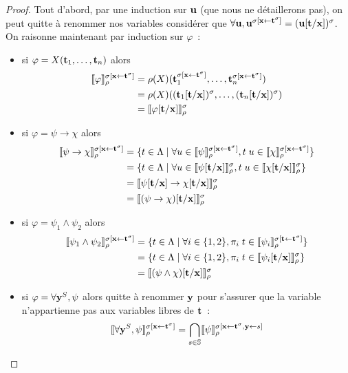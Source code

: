 \documentclass{article}
\begin{document}
\begin{proof}
  Tout d'abord, par une induction sur $\mathbf{u}$ (que nous ne détaillerons pas), on peut quitte à renommer nos variables considérer que $\forall \mathbf{u}, \mathbf{u}^{\sigma[\mathbf{x}\leftarrow \mathbf{t}^\sigma]} = (\mathbf{u}[\mathbf{t}/\mathbf{x}])^\sigma$. On raisonne maintenant par induction sur $\varphi$~:
  \begin{itemize}
  \item si $\varphi = X(\mathbf{t}_1,\ldots,\mathbf{t}_n)$ alors
    \begin{align*}
      \llbracket \varphi \rrbracket_\rho^{\sigma[\mathbf{x}\leftarrow \mathbf{t}^\sigma]} &= \rho(X)(\mathbf{t}_1^{\sigma[\mathbf{x}\leftarrow \mathbf{t}^\sigma]},\ldots,\mathbf{t}_n^{\sigma[\mathbf{x}\leftarrow \mathbf{t}^\sigma]})\\
      &= \rho(X)((\mathbf{t}_1[\mathbf{t}/\mathbf{x}])^\sigma,\ldots,(\mathbf{t}_n[\mathbf{t}/\mathbf{x}])^\sigma)\\
      &= \llbracket \varphi[\mathbf{t}/\mathbf{x}] \rrbracket_\rho^\sigma
    \end{align*}
  \item si $\varphi = \psi \to \chi$ alors
    \begin{align*}
      \llbracket \psi\to\chi \rrbracket_\rho^{\sigma[\mathbf{x}\leftarrow\mathbf{t}^\sigma]} &= \{t\in\Lambda\mid \forall u\in\llbracket \psi \rrbracket_\rho^{\sigma[\mathbf{x}\leftarrow\mathbf{t}^\sigma]}, t\;u \in \llbracket \chi \rrbracket_\rho^{\sigma[\mathbf{x}\leftarrow\mathbf{t}^\sigma]}\}\\
      &= \{t\in\Lambda\mid\forall u\in \llbracket \psi[\mathbf{t}/\mathbf{x}] \rrbracket_\rho^\sigma, t\;u\in\llbracket \chi[\mathbf{t}/\mathbf{x}] \rrbracket_\rho^\sigma\}\\
      &= \llbracket \psi[\mathbf{t}/\mathbf{x}]\to\chi[\mathbf{t}/\mathbf{x}] \rrbracket_\rho^\sigma\\
      &= \llbracket (\psi\to\chi)[\mathbf{t}/\mathbf{x}] \rrbracket_\rho^\sigma
    \end{align*}
  \item si $\varphi = \psi_1\land \psi_2$ alors
    \begin{align*}
      \llbracket \psi_1\land\psi_2 \rrbracket_\rho^{\sigma[\mathbf{x}\leftarrow\mathbf{t}^\sigma]} &= \{t\in\Lambda\mid \forall i \in\{1,2\}, \pi_i\;t\in \llbracket \psi_i \rrbracket_\rho^{\sigma[\mathbf{t}\leftarrow\mathbf{t}^\sigma]}\}\\
      &= \{t\in\Lambda\mid\forall i \in \{1,2\}, \pi_i\;t\in\llbracket \psi_i[\mathbf{t}/\mathbf{x}] \rrbracket_\rho^\sigma\}\\
      &= \llbracket (\psi\land\chi)[\mathbf{t}/\mathbf{x}] \rrbracket_\rho^\sigma
    \end{align*}
  \item si $\varphi = \forall \mathbf{y}^S, \psi$ alors quitte à renommer $\mathbf{y}$ pour s'assurer que la variable n'appartienne pas aux variables libres de $\mathbf{t}$~:
    \begin{align*}
      \trad{\forall \by^S,\psi}_\rho^{\sigma[\bx\leftarrow\bt^\sigma]} &= \bigcap_{s\in \bS}\trad{\psi}_\rho^{\sigma[\bx\leftarrow\bt^\sigma,\by\leftarrow s]}\\

\end{align*}
\end{itemize}
\end{proof}
\end{document}
